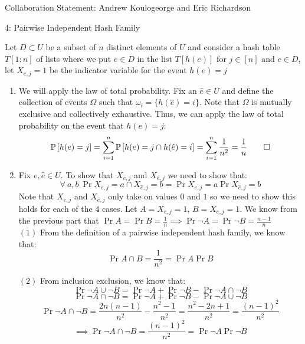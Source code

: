 \documentclass[12pt]{article}
\begin{document}

Collaboration Statement: Andrew Koulogeorge and Eric Richardson 


\begin{problem}{4: Pairwise Independent Hash Family}
\end{problem}
\begin{solution}
Let $D \subset U$ be a subset of $n$ distinct elements of $U$ and consider a hash table $T[1:n]$ of lists where we put $e \in D$ in the list $T[h(e)]$ for $j\in [n]$ and $e\in D$, let $X_{e,j}=1$ be the indicator variable for the event $h(e) = j$
\begin{enumerate}[label=(\alph*)]
\item We will apply the law of total probability. Fix an $\hat{e} \in U$ and define the collection of events $\Omega$ such that $\omega_i =\{h(\hat{e}) = i\}$. Note that $\Omega$ is mutually exclusive and collectively exhaustive. Thus, we can apply the law of total probability on the event that $h(e) = j$:
\[
\Pr{h(e) = j} = \sum_{i=1}^{n}{\Pr{h(e) = j \cap h(\hat{e}) = i }} = \sum_{i=1}^{n}{\frac{1}{n^2}} = \frac{1}{n} \qed
\]
\item Fix $e, \hat{e} \in U$. To show that $X_{e,j}$ and $X_{\hat{e},j}$ we need to show that:
\[
\forall~a,b~ \Pr{X_{e,j}=a \cap X_{\hat{e},j}=b} = \Pr{X_{e,j}=a} \Pr{X_{\hat{e},j}=b}
\]
Note that $X_{e,j}$ and $X_{\hat{e},j}$ only take on values $0$ and $1$ so we need to show this holds for each of the $4$ cases. Let $A = X_{e,j}=1$, $B = X_{e,j}=1$. We know from the previous part that $\Pr{A} = \Pr{B} = \frac{1}{n} \implies \Pr{\neg A} = \Pr{\neg B} = \frac{n-1}{n}$\\

$(1)$ From the definition of a pairwise independent hash family, we know that:
\[
\Pr{A \cap B} = \frac{1}{n^2} =\Pr{A}\Pr{B}
\]

$(2)$ From inclusion exclusion, we know that:
\[
\Pr{\neg A \cup \neg B} = \Pr{\neg A} + \Pr{\neg B} -\Pr{\neg A \cap \neg B}
\]
\[
\Pr{\neg A \cap \neg B} = \Pr{\neg A} + \Pr{\neg B} - \Pr{\neg A \cup \neg B}
\]
\[
\Pr{\neg A \cap \neg B} = \frac{2n(n-1)}{n^2}- \frac{n^2-1}{n^2} = \frac{n^2 - 2n + 1}{n^2} = \frac{(n-1)^2}{n^2}
\]
\[
\implies \Pr{\neg A \cap \neg B} = \frac{(n-1)^2}{n^2} = \Pr{\neg A}\Pr{\neg B} 
\]


\end{enumerate}
\end{solution}
\end{document}
